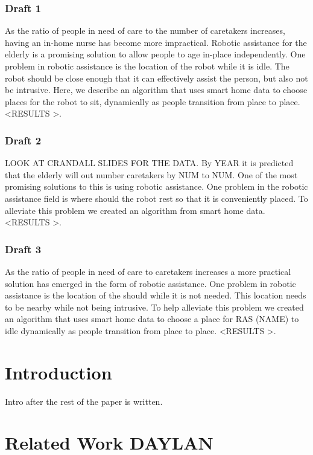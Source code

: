 \documentclass[11pt, draft, a4paper]{IEEEtran}
\begin{document}
\subsubsection{Draft 1}
As the ratio of people in need of care to the number of caretakers increases, having an in-home nurse has become more impractical. Robotic assistance for the elderly is a promising solution to allow people to age in-place independently. One problem in robotic assistance is the location of the robot while it is idle. The robot should be close enough that it can effectively assist the person, but also not be intrusive. Here, we describe an algorithm that uses smart home data to choose places for the robot to sit, dynamically as people transition from place to place. \textless RESULTS \textgreater. 


\subsubsection{Draft 2}
LOOK AT CRANDALL SLIDES FOR THE DATA.
By YEAR it is predicted that the elderly will out number caretakers by NUM to NUM. One of the most promising solutions to this is using robotic assistance. One problem in the robotic assistance field is where should the robot rest so that it is conveniently placed. To alleviate this problem we created an algorithm from smart home data. \textless RESULTS \textgreater. 

\subsubsection{Draft 3}
As the ratio of people in need of care to caretakers increases a more practical solution has emerged in the form of robotic assistance. One problem in robotic assistance is the location of the should while it is not needed. This location needs to be nearby while not being intrusive. To help alleviate this problem we created an algorithm that uses smart home data to choose a place for RAS (NAME) to idle dynamically as people transition from place to place. \textless RESULTS \textgreater. 



\section{Introduction}
Intro after the rest of the paper is written. 


\section{Related Work DAYLAN}
\end{document}
